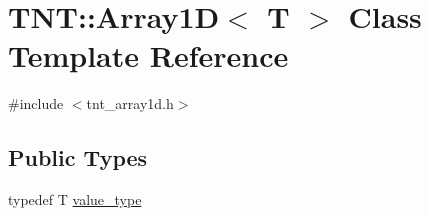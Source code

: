 \hypertarget{classTNT_1_1Array1D}{\section{T\-N\-T\-:\-:Array1\-D$<$ T $>$ Class Template Reference}
\label{classTNT_1_1Array1D}
}


{\ttfamily \#include $<$tnt\-\_\-array1d.\-h$>$}

\subsection*{Public Types}
\begin{DoxyCompactItemize}
\item 
typedef T \hyperlink{classTNT_1_1Array1D_aa33efada6a804a1b32da0e315baeb29c}{value\-\_\-type}
\end{DoxyCompactItemize}
